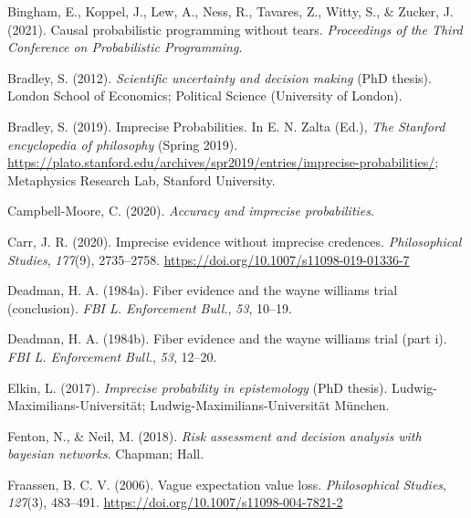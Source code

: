 \documentclass[
  10pt,
  dvipsnames,enabledeprecatedfontcommands]{scrartcl}
\newlength{\cslhangindent}
\newlength{\cslentryspacingunit} %
\newenvironment{CSLReferences}[2] %
 {%
  \setlength{\parindent}{0pt}
  \ifodd #1
  \let\oldpar\par
  \def\par{\hangindent=\cslhangindent\oldpar}
  \fi
  \setlength{\parskip}{#2\cslentryspacingunit}
 }%
 {}
\begin{document}
\hypertarget{refs}{}
\begin{CSLReferences}{1}{0}
\leavevmode{}%
Bingham, E., Koppel, J., Lew, A., Ness, R., Tavares, Z., Witty, S., \&
Zucker, J. (2021). Causal probabilistic programming without tears.
\emph{Proceedings of the Third Conference on Probabilistic Programming}.

\leavevmode{}%
Bradley, S. (2012). \emph{Scientific uncertainty and decision making}
(PhD thesis). London School of Economics; Political Science (University
of London).

\leavevmode{}%
Bradley, S. (2019). {Imprecise Probabilities}. In E. N. Zalta (Ed.),
\emph{The {Stanford} encyclopedia of philosophy} ({S}pring 2019).
\url{https://plato.stanford.edu/archives/spr2019/entries/imprecise-probabilities/};
Metaphysics Research Lab, Stanford University.

\leavevmode{}%
Campbell-Moore, C. (2020). \emph{Accuracy and imprecise probabilities}.

\leavevmode{}%
Carr, J. R. (2020). Imprecise evidence without imprecise credences.
\emph{Philosophical Studies}, \emph{177}(9), 2735--2758.
\url{https://doi.org/10.1007/s11098-019-01336-7}

\leavevmode{}%
Deadman, H. A. (1984a). Fiber evidence and the wayne williams trial
(conclusion). \emph{FBI L. Enforcement Bull.}, \emph{53}, 10--19.

\leavevmode{}%
Deadman, H. A. (1984b). Fiber evidence and the wayne williams trial
(part i). \emph{FBI L. Enforcement Bull.}, \emph{53}, 12--20.

\leavevmode{}%
Elkin, L. (2017). \emph{Imprecise probability in epistemology} (PhD
thesis). Ludwig-Maximilians-Universit{ä}t;
Ludwig-Maximilians-Universität München.

\leavevmode{}%
Fenton, N., \& Neil, M. (2018). \emph{Risk assessment and decision
analysis with bayesian networks}. Chapman; Hall.

\leavevmode{}%
Fraassen, B. C. V. (2006). Vague expectation value loss.
\emph{Philosophical Studies}, \emph{127}(3), 483--491.
\url{https://doi.org/10.1007/s11098-004-7821-2}


\end{CSLReferences}
\end{document}
